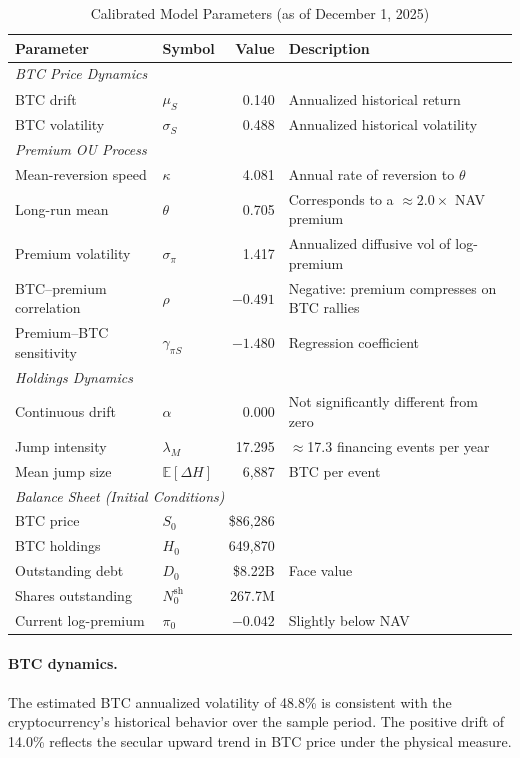 \begin{table}[H]
\centering
\caption{Calibrated Model Parameters (as of December 1, 2025)}
\label{tab:params}
\begin{tabular}{@{}llrl@{}}
\toprule
\textbf{Parameter} & \textbf{Symbol} & \textbf{Value} & \textbf{Description} \\
\midrule
\multicolumn{4}{l}{\textit{BTC Price Dynamics}} \\
BTC drift & $\mu_S$ & 0.140 & Annualized historical return \\
BTC volatility & $\sigma_S$ & 0.488 & Annualized historical volatility \\
\midrule
\multicolumn{4}{l}{\textit{Premium OU Process}} \\
Mean-reversion speed & $\kappa$ & 4.081 & Annual rate of reversion to $\theta$ \\
Long-run mean & $\theta$ & 0.705 & Corresponds to a $\approx 2.0\times$ NAV premium \\
Premium volatility & $\sigma_\pi$ & 1.417 & Annualized diffusive vol of log-premium \\
BTC--premium correlation & $\rho$ & $-0.491$ & Negative: premium compresses on BTC rallies \\
Premium--BTC sensitivity & $\gamma_{\pi S}$ & $-1.480$ & Regression coefficient \\
\midrule
\multicolumn{4}{l}{\textit{Holdings Dynamics}} \\
Continuous drift & $\alpha$ & 0.000 & Not significantly different from zero \\
Jump intensity & $\lambda_M$ & 17.295 & $\approx$17.3 financing events per year \\
Mean jump size & $\mathbb{E}[\Delta H]$ & 6{,}887 & BTC per event \\
\midrule
\multicolumn{4}{l}{\textit{Balance Sheet (Initial Conditions)}} \\
BTC price & $S_0$ & \$86{,}286 & \\
BTC holdings & $H_0$ & 649{,}870 & \\
Outstanding debt & $D_0$ & \$8.22B & Face value \\
Shares outstanding & $N_0^{\text{sh}}$ & 267.7M & \\
Current log-premium & $\pi_0$ & $-0.042$ & Slightly below NAV \\
\bottomrule
\end{tabular}
\end{table}

\paragraph{BTC dynamics.} The estimated BTC annualized volatility of 48.8\% is consistent with the cryptocurrency's historical behavior over the sample period. The positive drift of 14.0\% reflects the secular upward trend in BTC price under the physical measure.


